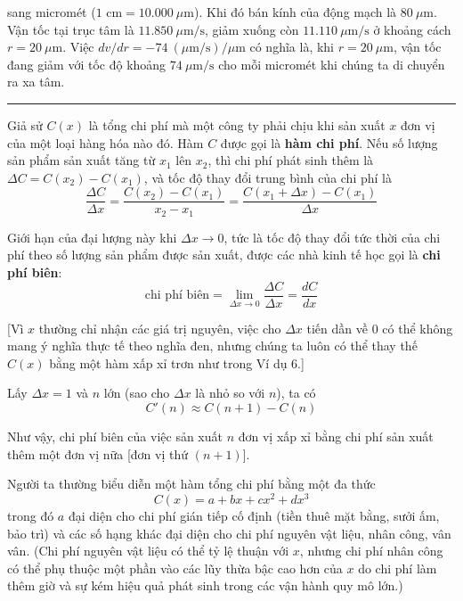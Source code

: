 \noindent
sang micromét ($1\text{ cm} = 10.000\ \mu\text{m}$). Khi đó bán kính của động mạch là $80\ \mu\text{m}$. Vận tốc tại trục tâm là $11.850\ \mu\text{m/s}$, giảm xuống còn $11.110\ \mu\text{m/s}$ ở khoảng cách $r = 20\ \mu\text{m}$. Việc $dv/dr = -74\ (\mu\text{m/s})/\mu\text{m}$ có nghĩa là, khi $r = 20\ \mu\text{m}$, vận tốc đang giảm với tốc độ khoảng $74\ \mu\text{m/s}$ cho mỗi micromét khi chúng ta di chuyển ra xa tâm.\hfill{\color{stewartblue}\rule{1.1ex}{1.1ex}}

\vspace{1.2em}

\noindent{\color{stewartblue}\rule[0.05ex]{1.15ex}{1.15ex}}\hspace{0.5em}{\sffamily\bfseries\large Kinh tế học}

\vspace{0.8em}

\quad Giả sử $C(x)$ là tổng chi phí mà một công ty phải chịu khi sản xuất $x$ đơn vị của một loại hàng hóa nào đó. Hàm $C$ được gọi là \textbf{hàm chi phí}. Nếu số lượng sản phẩm sản xuất tăng từ $x_1$ lên $x_2$, thì chi phí phát sinh thêm là $\Delta C = C(x_2) - C(x_1)$, và tốc độ thay đổi trung bình của chi phí là
\[
\frac{\Delta C}{\Delta x} = \frac{C(x_2) - C(x_1)}{x_2 - x_1} = \frac{C(x_1 + \Delta x) - C(x_1)}{\Delta x}
\]

Giới hạn của đại lượng này khi $\Delta x \to 0$, tức là tốc độ thay đổi tức thời của chi phí theo số lượng sản phẩm được sản xuất, được các nhà kinh tế học gọi là \textbf{chi phí biên}:
\[
\text{chi phí biên} = \lim_{\Delta x \to 0} \frac{\Delta C}{\Delta x} = \frac{dC}{dx}
\]

[Vì $x$ thường chỉ nhận các giá trị nguyên, việc cho $\Delta x$ tiến dần về $0$ có thể không mang ý nghĩa thực tế theo nghĩa đen, nhưng chúng ta luôn có thể thay thế $C(x)$ bằng một hàm xấp xỉ trơn như trong Ví dụ 6.]

Lấy $\Delta x = 1$ và $n$ lớn (sao cho $\Delta x$ là nhỏ so với $n$), ta có
\[
C'(n) \approx C(n + 1) - C(n)
\]

Như vậy, chi phí biên của việc sản xuất $n$ đơn vị xấp xỉ bằng chi phí sản xuất thêm một đơn vị nữa [đơn vị thứ $(n + 1)$].

Người ta thường biểu diễn một hàm tổng chi phí bằng một đa thức
\[
C(x) = a + bx + cx^2 + dx^3
\]
trong đó $a$ đại diện cho chi phí gián tiếp cố định (tiền thuê mặt bằng, sưởi ấm, bảo trì) và các số hạng khác đại diện cho chi phí nguyên vật liệu, nhân công, vân vân. (Chi phí nguyên vật liệu có thể tỷ lệ thuận với $x$, nhưng chi phí nhân công có thể phụ thuộc một phần vào các lũy thừa bậc cao hơn của $x$ do chi phí làm thêm giờ và sự kém hiệu quả phát sinh trong các vận hành quy mô lớn.)


